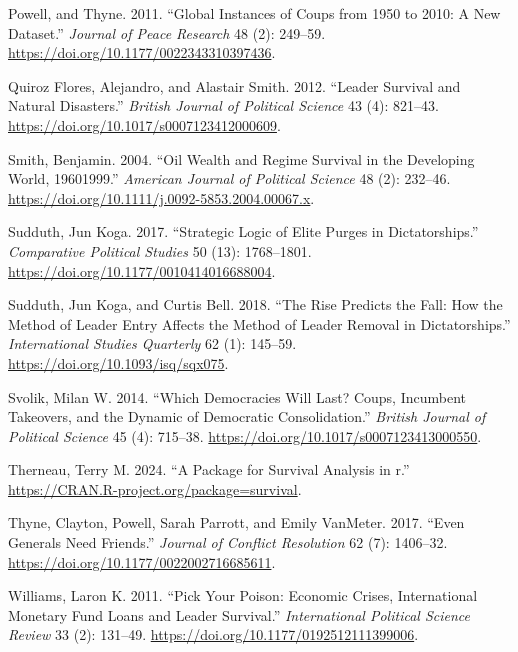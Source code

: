 \documentclass[
  12pt,
]{article}
\newlength{\cslhangindent}
\newenvironment{CSLReferences}[2] %
 {\begin{list}{}{%
  \setlength{\itemindent}{0pt}
  \setlength{\leftmargin}{0pt}
  \setlength{\parsep}{0pt}
  \ifodd #1
   \setlength{\leftmargin}{\cslhangindent}
   \setlength{\itemindent}{-1\cslhangindent}
  \fi
  \setlength{\itemsep}{#2\baselineskip}}}
 {\end{list}}
\begin{document}
\begin{CSLReferences}{1}{0}
Powell, and Thyne. 2011. {``Global Instances of Coups from 1950 to 2010:
A New Dataset.''} \emph{Journal of Peace Research} 48 (2): 249--59.
\url{https://doi.org/10.1177/0022343310397436}.

Quiroz Flores, Alejandro, and Alastair Smith. 2012. {``Leader Survival
and Natural Disasters.''} \emph{British Journal of Political Science} 43
(4): 821--43. \url{https://doi.org/10.1017/s0007123412000609}.

Smith, Benjamin. 2004. {``Oil Wealth and Regime Survival in the
Developing World, 1960{\textendash}1999.''} \emph{American Journal of
Political Science} 48 (2): 232--46.
\url{https://doi.org/10.1111/j.0092-5853.2004.00067.x}.

Sudduth, Jun Koga. 2017. {``Strategic Logic of Elite Purges in
Dictatorships.''} \emph{Comparative Political Studies} 50 (13):
1768--1801. \url{https://doi.org/10.1177/0010414016688004}.

Sudduth, Jun Koga, and Curtis Bell. 2018. {``The Rise Predicts the Fall:
How the Method of Leader Entry Affects the Method of Leader Removal in
Dictatorships.''} \emph{International Studies Quarterly} 62 (1):
145--59. \url{https://doi.org/10.1093/isq/sqx075}.

Svolik, Milan W. 2014. {``Which Democracies Will Last? Coups, Incumbent
Takeovers, and the Dynamic of Democratic Consolidation.''} \emph{British
Journal of Political Science} 45 (4): 715--38.
\url{https://doi.org/10.1017/s0007123413000550}.

Therneau, Terry M. 2024. {``A Package for Survival Analysis in r.''}
\url{https://CRAN.R-project.org/package=survival}.

Thyne, Clayton, Powell, Sarah Parrott, and Emily VanMeter. 2017. {``Even
Generals Need Friends.''} \emph{Journal of Conflict Resolution} 62 (7):
1406--32. \url{https://doi.org/10.1177/0022002716685611}.

Williams, Laron K. 2011. {``Pick Your Poison: Economic Crises,
International Monetary Fund Loans and Leader Survival.''}
\emph{International Political Science Review} 33 (2): 131--49.
\url{https://doi.org/10.1177/0192512111399006}.


\end{CSLReferences}
\end{document}
